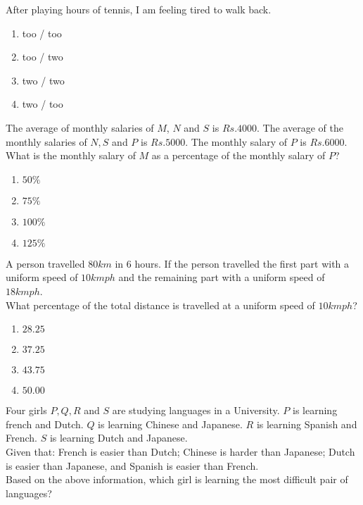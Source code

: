 \iffalse
\chapter{2022}
\author{EE24BTECH11037}
\section{me}
\fi


    \item After playing \underline{\hspace{1.5cm}} hours of tennis, I am feeling \underline{\hspace{1.5cm}} tired to walk back.
    \begin{enumerate}
        \item too / too
        \item too / two
        \item two / two
        \item two / too
    \end{enumerate}
    \item The average of monthly salaries of $M$, $N$ and $S$ is $Rs.4000$. The average of the monthly salaries of $N,S$ and $P$ is $Rs.5000$. The monthly salary of $P$ is $Rs.6000$. What is the monthly salary of $M$ as a percentage of the monthly salary of $P$?
    \begin{enumerate}
        \item $50\%$
        \item $75\%$
        \item $100\%$
        \item $125\%$
    \end{enumerate}
    \item A person travelled $80km$ in $6$ hours. If the person travelled the first part with a uniform speed of $10kmph$ and the remaining part with a uniform speed of $18 kmph$.\\What percentage of the total distance is travelled at a uniform speed of $10kmph$?
    \begin{enumerate}
        \item $28.25$
        \item $37.25$
        \item $43.75$
        \item $50.00$
    \end{enumerate}
    \item Four girls $P,Q,R$ and $S$ are studying languages in a University. $P$ is learning french and Dutch. $Q$ is learning Chinese and Japanese. $R$ is learning Spanish and French. $S$ is learning Dutch and Japanese.\\Given that: French is easier than Dutch; Chinese is harder than Japanese; Dutch is easier than Japanese, and Spanish is easier than French.\\Based on the above information, which girl is learning the most difficult pair of languages?
